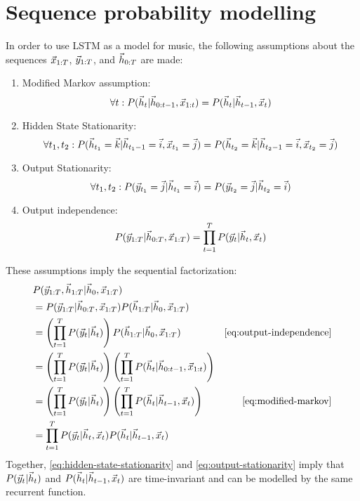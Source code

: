 \section{Sequence probability modelling}


In order to use LSTM as a model for music, the following assumptions
about the sequences $\vec{x}_{1:T}$, $\vec{y}_{1:T}$, and $\vec{h}_{0:T}$ are made:
\begin{enumerate}
  \item Modified Markov assumption:
    \begin{equation}
      \label{eq:modified-markov}
      \forall t: P(\vec{h}_t | \vec{h}_{0:t-1}, \vec{x}_{1:t}) = P(\vec{h}_t | \vec{h}_{t-1}, \vec{x}_t)
    \end{equation}
  \item Hidden State Stationarity:
    \begin{equation}
      \label{eq:hidden-state-stationarity}
      \forall t_1, t_2: P(\vec{h}_{t_1} = \vec{k} | \vec{h}_{t_{1}-1} = \vec{i}, \vec{x}_{t_1} = \vec{j}) = P(\vec{h}_{t_2} = \vec{k} | \vec{h}_{t_{2}-1} = \vec{i}, \vec{x}_{t_2} = \vec{j})
   \end{equation}
  \item Output Stationarity:
    \begin{equation}
      \label{eq:output-stationarity}
      \forall t_1, t_2: P(\vec{y}_{t_1} = \vec{j} | \vec{h}_{t_1} = \vec{i}) = P(\vec{y}_{t_2} = \vec{j} | \vec{h}_{t_2} = \vec{i})
   \end{equation}
  \item Output independence:
   \begin{equation}
     \label{eq:output-independence}
     P(\vec{y}_{1:T} | \vec{h}_{0:T}, \vec{x}_{1:T}) = \prod_{t=1}^T P(\vec{y}_t | \vec{h}_{t}, \vec{x}_t)
   \end{equation}
\end{enumerate}

These assumptions imply the sequential factorization:
\begin{align}
  &P(\y_{1:T}, \h_{1:T} | \h_0, \x_{1:T})  &\\
  &= P(\y_{1:T} | \h_{0:T}, \x_{1:T}) P(\h_{1:T} | \h_0, \x_{1:T})  &\\
  &= \left( \prod_{t=1}^T P(\y_t | \h_t) \right) P(\h_{1:T}| \h_0, \x_{1:T}) &\text{\cref{eq:output-independence}}\\
  &= \left( \prod_{t=1}^T P(\y_t | \h_t) \right) \left(\prod_{t=1}^T P(\h_{t}| \h_{0:t-1}, \x_{1:t})\right) &\\
  &= \left( \prod_{t=1}^T P(\y_t | \h_t) \right) \left(\prod_{t=1}^T P(\h_{t}| \h_{t-1}, \x_{t})\right) &\text{\cref{eq:modified-markov}}\\
  &= \prod_{t=1}^T P(\y_t | \h_t, \x_t) P(\h_{t}| \h_{t-1}, \x_{t}) & \\
\end{align}
Together, \cref{eq:hidden-state-stationarity} and \cref{eq:output-stationarity} imply that $P(\vec{y}_t | \vec{h}_t)$
and $P(\vec{h}_{t}| \vec{h}_{t-1}, \vec{x}_{t})$ are time-invariant and can be modelled by the same recurrent function.

